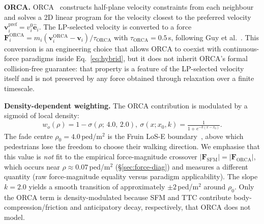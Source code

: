 \documentclass[a4paper,twoside]{article}
\begin{document}
\textbf{ORCA.}
ORCA~\cite{VandenBerg11} constructs half-plane velocity constraints from each neighbour and solves a 2D linear program for the velocity closest to the preferred velocity $\mathbf{v}_i^{\text{pref}}=v_i^0\hat{\mathbf{e}}_i$. The LP-selected velocity is converted to a force $\mathbf{F}_i^{\text{ORCA}} = m_i(\mathbf{v}_i^{\text{ORCA}}-\mathbf{v}_i)/\tau_{\text{ORCA}}$ with $\tau_{\text{ORCA}}=0.5$\,s, following Guy et al.~\cite{Guy10}. This conversion is an engineering choice that allows ORCA to coexist with continuous-force paradigms inside Eq.~\eqref{eq:hybrid}, but it does not inherit ORCA's formal collision-free guarantee: that property is a feature of the LP-selected velocity itself and is not preserved by any force obtained through relaxation over a finite timescale.

\textbf{Density-dependent weighting.}
The ORCA contribution is modulated by a sigmoid of local density:
\begin{equation}\label{eq:sigmoid}
    w_o(\rho) = 1 - \sigma(\rho;\,4.0,\,2.0),\ \sigma(x;x_0,k) = \tfrac{1}{1+e^{-k(x-x_0)}}.
\end{equation}
The fade centre $\rho_0\!=\!4.0$\,ped/m$^2$ is the Fruin LoS-E boundary~\cite{Fruin71}, above which pedestrians lose the freedom to choose their walking direction. We emphasise that this value is \emph{not} fit to the empirical force-magnitude crossover $|\mathbf{F}_{\mathrm{SFM}}|\!=\!|\mathbf{F}_{\mathrm{ORCA}}|$, which occurs near $\rho\!\approx\!0.07$\,ped/m$^2$ (\S\ref{sec:force-diag}) and measures a different quantity (raw force-magnitude equality versus paradigm applicability). The slope $k\!=\!2.0$ yields a smooth transition of approximately $\pm 2$\,ped/m$^2$ around $\rho_0$. Only the ORCA term is density-modulated because SFM and TTC contribute body-compression/friction and anticipatory decay, respectively, that ORCA does not model.
\end{document}
